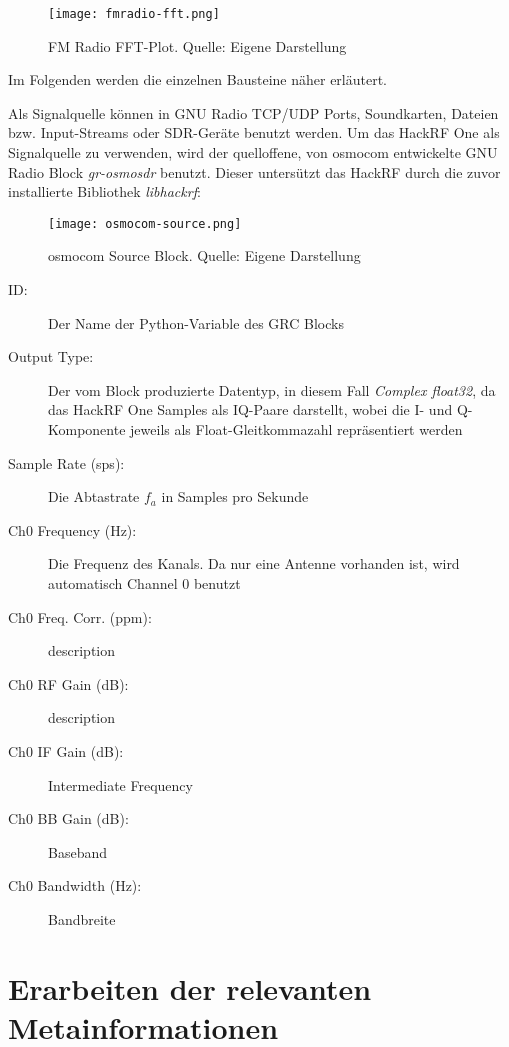 \begin{figure}[ht]
	\centering
	\texttt{[image: fmradio-fft.png]}
	\caption[FM Radio FFT-Plot]{FM Radio FFT-Plot. Quelle: Eigene Darstellung} 
	\label{fmradio-fft}
\end{figure}

Im Folgenden werden die einzelnen Bausteine näher erläutert.


\newpage
Als Signalquelle können in GNU Radio TCP/UDP Ports, Soundkarten, Dateien bzw. Input-Streams oder \ac{SDR}-Geräte benutzt werden.\newline
Um das HackRF One als Signalquelle zu verwenden, wird der quelloffene, von \ac{osmocom} \cite{osmocom:2018} entwickelte GNU Radio Block \textit{gr-osmosdr} \cite{gr-osmosdr:2018} benutzt.
Dieser untersützt das HackRF durch die zuvor installierte Bibliothek \textit{libhackrf}:

\begin{figure}[ht]
	\centering
	\texttt{[image: osmocom-source.png]}
	\caption[osmocom Source Block]{osmocom Source Block. Quelle: Eigene Darstellung} 
	\label{osmocom-source}
\end{figure}

\begin{description}
	\item[ID:] Der Name der Python-Variable des GRC Blocks
	\item[Output Type:] Der vom Block produzierte Datentyp, in diesem Fall \textit{Complex float32}, da das HackRF One Samples als IQ-Paare darstellt, wobei die I- und Q-Komponente jeweils als Float-Gleitkommazahl repräsentiert werden
	\item [Sample Rate (sps):] Die Abtastrate $f_a$ in Samples pro Sekunde
	\item[Ch0 Frequency (Hz):] Die Frequenz des Kanals. Da nur eine Antenne vorhanden ist, wird automatisch Channel 0 benutzt
	\item[Ch0 Freq. Corr. (ppm):] description %
	\item[Ch0 RF Gain (dB):] description
	\item[Ch0 IF Gain (dB):] Intermediate Frequency
	\item[Ch0 BB Gain (dB):] Baseband
	\item[Ch0 Bandwidth (Hz):] Bandbreite
\end{description}






\section{Erarbeiten der relevanten Metainformationen}


